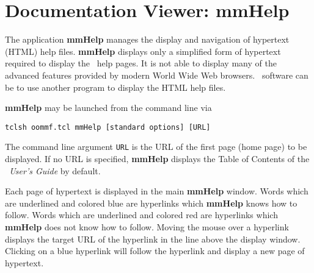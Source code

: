 \chapter{Documentation Viewer: mmHelp}\label{sec:mmhelp}

\begin{center}
\end{center}

The application {\bf mmHelp} manages the display and navigation of
hypertext (HTML) help files.  
%
{\bf mmHelp} displays only a simplified form of hypertext
required to display the \OOMMF\ help pages.
It is not able to display many of
the advanced features provided by modern World Wide Web
browsers.  
\OOMMF\ software can be  to use another program to display the HTML
help files.

{\bf mmHelp} may be launched from the command line via
\begin{verbatim}
tclsh oommf.tcl mmHelp [standard options] [URL]
\end{verbatim}
The command line argument {\tt URL} is the URL of the first
page (home page) to be displayed.  If no URL is specified,
{\bf mmHelp} displays the Table of Contents of the {\em \OOMMF\ User's
Guide} by default.

Each page of hypertext is displayed in the main {\bf mmHelp} window.
Words which are underlined and colored blue are hyperlinks which {\bf
mmHelp} knows how to follow.  Words which are underlined and colored red
are hyperlinks which {\bf mmHelp} does not know how to follow.  Moving
the mouse over a hyperlink displays the target URL of the hyperlink in
the  line above the display window.  Clicking on a blue
hyperlink will follow the hyperlink and display a new page of hypertext.

